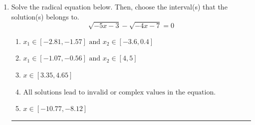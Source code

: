 \documentclass[14pt]{extbook}
\newcommand{\litem}[1]{\item#1\hspace*{-1cm}\rule{\textwidth}{0.4pt}}
\begin{document}
\begin{enumerate}
{\begin{enumerate}[label=\Alph*.]
\end{enumerate} }
\litem{
Solve the radical equation below. Then, choose the interval(s) that the solution(s) belongs to.\[ \sqrt{-5 x - 3} - \sqrt{-4 x - 7} = 0 \]\begin{enumerate}[label=\Alph*.]
\item \( x_1 \in [-2.81, -1.57] \text{ and } x_2 \in [-3.6,0.4] \)
\item \( x_1 \in [-1.07, -0.56] \text{ and } x_2 \in [4,5] \)
\item \( x \in [3.35,4.65] \)
\item \( \text{All solutions lead to invalid or complex values in the equation.} \)
\item \( x \in [-10.77,-8.12] \)

\end{enumerate} }
\end{enumerate}
\end{document}
